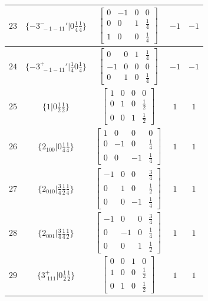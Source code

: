 \documentclass[fleqn,8pt]{jsarticle}
\begin{document}
\begin{longtable}{ccccc}
$ 23 $ & $ \{-3^{-}_{\,\,-1-11}{}'|0 \frac{1}{4} \frac{1}{4}\} $ & $ \begin{bmatrix} 0 & -1 & 0 & 0 \\ 0 & 0 & 1 & \frac{1}{4} \\ 1 & 0 & 0 & \frac{1}{4} \end{bmatrix} $ & $ -1 $ & $ -1 $ \\ \hline
$ 24 $ & $ \{-3^{+}_{\,\,-1-11}{}'|\frac{1}{4} 0 \frac{1}{4}\} $ & $ \begin{bmatrix} 0 & 0 & 1 & \frac{1}{4} \\ -1 & 0 & 0 & 0 \\ 0 & 1 & 0 & \frac{1}{4} \end{bmatrix} $ & $ -1 $ & $ -1 $ \\ \hline
$ 25 $ & $ \{1|0 \frac{1}{2} \frac{1}{2}\} $ & $ \begin{bmatrix} 1 & 0 & 0 & 0 \\ 0 & 1 & 0 & \frac{1}{2} \\ 0 & 0 & 1 & \frac{1}{2} \end{bmatrix} $ & $ 1 $ & $ 1 $ \\ \hline
$ 26 $ & $ \{2{}_{100}|0 \frac{1}{4} \frac{1}{4}\} $ & $ \begin{bmatrix} 1 & 0 & 0 & 0 \\ 0 & -1 & 0 & \frac{1}{4} \\ 0 & 0 & -1 & \frac{1}{4} \end{bmatrix} $ & $ 1 $ & $ 1 $ \\ \hline
$ 27 $ & $ \{2{}_{010}|\frac{3}{4} \frac{1}{2} \frac{1}{4}\} $ & $ \begin{bmatrix} -1 & 0 & 0 & \frac{3}{4} \\ 0 & 1 & 0 & \frac{1}{2} \\ 0 & 0 & -1 & \frac{1}{4} \end{bmatrix} $ & $ 1 $ & $ 1 $ \\ \hline
$ 28 $ & $ \{2{}_{001}|\frac{3}{4} \frac{1}{4} \frac{1}{2}\} $ & $ \begin{bmatrix} -1 & 0 & 0 & \frac{3}{4} \\ 0 & -1 & 0 & \frac{1}{4} \\ 0 & 0 & 1 & \frac{1}{2} \end{bmatrix} $ & $ 1 $ & $ 1 $ \\ \hline
$ 29 $ & $ \{3^{+}_{\,\,111}|0 \frac{1}{2} \frac{1}{2}\} $ & $ \begin{bmatrix} 0 & 0 & 1 & 0 \\ 1 & 0 & 0 & \frac{1}{2} \\ 0 & 1 & 0 & \frac{1}{2} \end{bmatrix} $ & $ 1 $ & $ 1 $ \\ \hline

\end{longtable}
\end{document}
